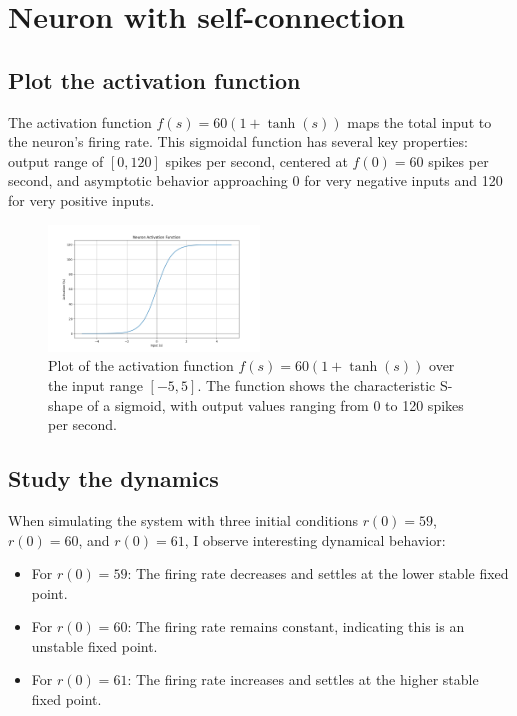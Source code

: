 \documentclass{article}
\begin{document}
\section{Neuron with self-connection}

\subsection{Plot the activation function}

The activation function $f(s) = 60(1 + \tanh(s))$ maps the total input to the neuron's firing rate. 
This sigmoidal function has several key properties: output range of $[0, 120]$ spikes per second, centered at $f(0) = 60$ spikes per second, and asymptotic behavior approaching 0 for very negative inputs and 120 for very positive inputs. 



\begin{figure}[H]
    \centering
    \includegraphics[width=0.5\textwidth]{activation_function.png}
    \caption{Plot of the activation function $f(s) = 60(1 + \tanh(s))$ over the input range $[-5, 5]$. The function shows the characteristic S-shape of a sigmoid, with output values ranging from 0 to 120 spikes per second.}
    \label{fig:activation}
\end{figure}

\subsection{Study the dynamics}

When simulating the system with three initial conditions $r(0) = 59$, $r(0) = 60$, and $r(0) = 61$, I observe interesting dynamical behavior:

\begin{itemize}
    \item For $r(0) = 59$: The firing rate decreases and settles at the lower stable fixed point.
    \item For $r(0) = 60$: The firing rate remains constant, indicating this is an unstable fixed point.
    \item For $r(0) = 61$: The firing rate increases and settles at the higher stable fixed point.
\end{itemize}
\end{document}
